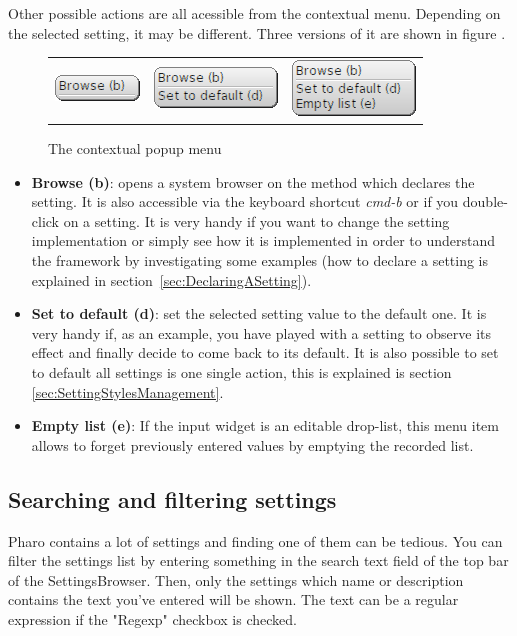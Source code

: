 \documentclass[a4paper,10pt,twoside]{book}
\begin{document}
Other possible actions are all acessible from the contextual menu.
Depending on the selected setting, it may be different. Three versions of it are shown in figure .
\begin{figure}[tbh]
\begin{center}
\begin{tabular}{ccc}
\includegraphics[scale=0.5]{popup0.png} & 
	\includegraphics[scale=0.5]{popup1.png} & 
	\includegraphics[scale=0.5]{popup2.png} \\ 
\end{tabular} 
\caption{The contextual popup menu}
\end{center}
\end{figure}
\begin{itemize}
\item \textbf{Browse (b)}: opens a system browser on the method which declares the setting. It is also accessible via the keyboard shortcut \textit{cmd-b} or if you double-click on a setting. It is very handy if you want to change the setting implementation or simply see how it is implemented in order to understand the framework by investigating some examples (how to declare a setting is explained in section~\ref{sec:DeclaringASetting}).
\item \textbf{Set to default (d)}: set the selected setting value to the default one. It is very handy if, as an example, you have played with a setting to observe its effect and finally decide to come back to its default. It is also possible to set to default all settings is one single action, this is explained is section \ref{sec:SettingStylesManagement}.
\item \textbf{Empty list (e)}: If the input widget is an editable drop-list, this menu item allows to forget previously entered values by emptying the recorded list.
\end{itemize}

\subsection{Searching and filtering settings}
Pharo contains a lot of settings and finding one of them can be tedious. 
You can filter the settings list by entering something in the search text field of the top bar of the SettingsBrowser. Then, only the settings which name or description contains the text you've entered will be shown. The text can be a regular expression if the "Regexp" checkbox is checked.
\end{document}
